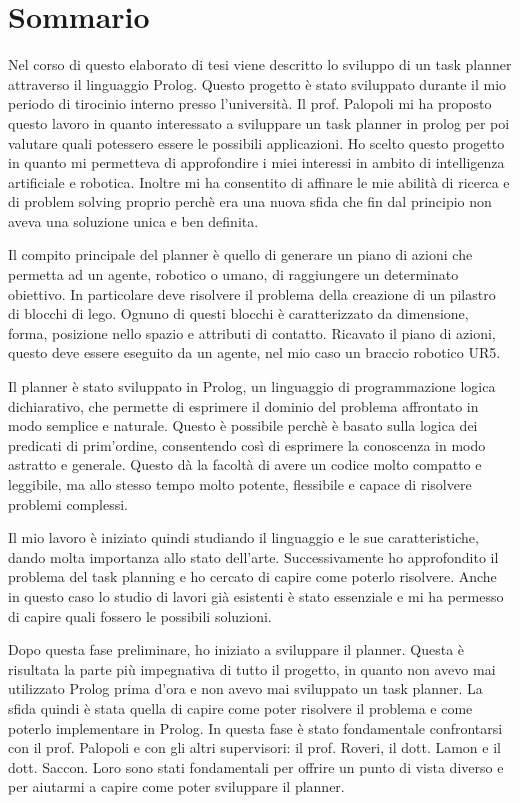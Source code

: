 \chapter*{Sommario} %
\label{sommario}

Nel corso di questo elaborato di tesi viene descritto lo sviluppo di un task planner attraverso il linguaggio Prolog.
Questo progetto è stato sviluppato durante il mio periodo di tirocinio interno presso l'università.
Il prof. Palopoli mi ha proposto questo lavoro in quanto interessato a sviluppare un task planner in prolog per poi valutare quali potessero essere le possibili applicazioni.
Ho scelto questo progetto in quanto mi permetteva di approfondire i miei interessi in ambito di intelligenza artificiale e robotica.
Inoltre mi ha consentito di affinare le mie abilità di ricerca e di problem solving proprio perchè era una nuova sfida che fin dal principio non aveva una soluzione unica e ben definita.  

Il compito principale del planner è quello di generare un piano di azioni che permetta ad un agente, robotico o umano, di raggiungere un determinato obiettivo.
In particolare deve risolvere il problema della creazione di un pilastro di blocchi di lego. Ognuno di questi blocchi è caratterizzato da dimensione, forma, posizione nello spazio e attributi di contatto.
Ricavato il piano di azioni, questo deve essere eseguito da un agente, nel mio caso un braccio robotico UR5. 

Il planner è stato sviluppato in Prolog, un linguaggio di programmazione logica dichiarativo, che permette di esprimere il dominio del problema affrontato in modo semplice e naturale.
Questo è possibile perchè è basato sulla logica dei predicati di prim'ordine, consentendo così di esprimere la conoscenza in modo astratto e generale.
Questo dà la facoltà di avere un codice molto compatto e leggibile, ma allo stesso tempo molto potente, flessibile e capace di risolvere problemi complessi.

Il mio lavoro è iniziato quindi studiando il linguaggio e le sue caratteristiche, dando molta importanza allo stato dell'arte. 
Successivamente ho approfondito il problema del task planning e ho cercato di capire come poterlo risolvere. Anche in questo caso lo studio di lavori già esistenti è stato essenziale e mi ha permesso di capire quali fossero le possibili soluzioni.

Dopo questa fase preliminare, ho iniziato a sviluppare il planner. Questa è risultata la parte più impegnativa di tutto il progetto, in quanto non avevo mai utilizzato Prolog prima d'ora e non avevo mai sviluppato un task planner.
La sfida quindi è stata quella di capire come poter risolvere il problema e come poterlo implementare in Prolog. In questa fase è stato fondamentale confrontarsi con il prof. Palopoli e con gli altri supervisori: il prof. Roveri, il dott. Lamon e il dott. Saccon.
Loro sono stati fondamentali per offrire un punto di vista diverso e per aiutarmi a capire come poter sviluppare il planner. 

